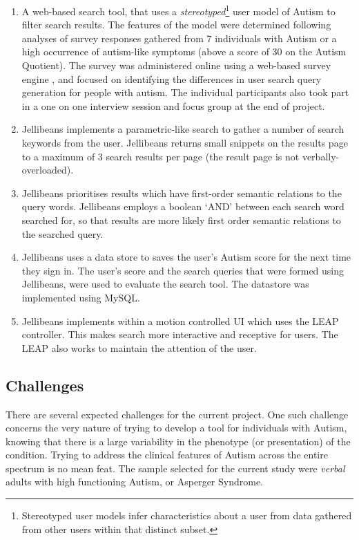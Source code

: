 \documentclass[a4paper, 11pt]{article}
\begin{document}
\begin{enumerate}
\item {A web-based search tool, that uses a \textit{stereotyped}\footnote{Stereotyped user models infer characteristics about a user from data gathered from other users within that distinct subset.} user model of Autism to filter search results. The features of the model were determined following analyses of survey responses gathered from 7 individuals with Autism or a high occurrence of autism-like symptoms (above a score of 30 on the Autism Quotient). The survey was administered online using a web-based survey engine \cite{surveymonkey}, and focused on identifying the differences in user search query generation for people with autism. The individual participants also took part in a one on one interview session and focus group at the end of project.}

\item {Jellibeans implements a parametric-like search to gather a number of search keywords from the user. Jellibeans returns small snippets on the results page to a maximum of 3 search results per page (the result page is not verbally-overloaded).}

\item {Jellibeans prioritises results which have first-order semantic relations to the query words. Jellibeans employs a boolean `AND' between each search word searched for, so that results are more likely first order semantic relations to the searched query.}

\item {Jellibeans uses a data store to saves the user's Autism score for the next time they sign in. The user's score and the search queries that were formed using Jellibeans, were used to evaluate the search tool. The datastore was implemented using MySQL.}

\item {Jellibeans implements within a motion controlled UI which uses the LEAP controller. This makes search more interactive and receptive for users. The LEAP also works to maintain the attention of the user.}

\end{enumerate}

\subsection{Challenges}
There are several expected challenges for the current project. One such challenge concerns the very nature of trying to develop a tool for individuals with Autism, knowing that there is a large variability in the phenotype (or presentation) of the condition. Trying to address the clinical features of Autism across the entire spectrum is no mean feat. The sample selected for the current study were \textit{verbal} adults with high functioning Autism, or Asperger Syndrome. 
\end{document}
